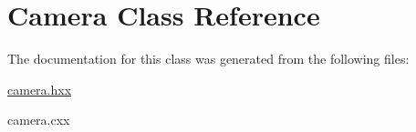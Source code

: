 \hypertarget{classCamera}{\section{Camera Class Reference}
\label{classCamera}
}


The documentation for this class was generated from the following files\-:\begin{DoxyCompactItemize}
\item 
\hyperlink{camera_8hxx}{camera.\-hxx}\item 
camera.\-cxx\end{DoxyCompactItemize}
